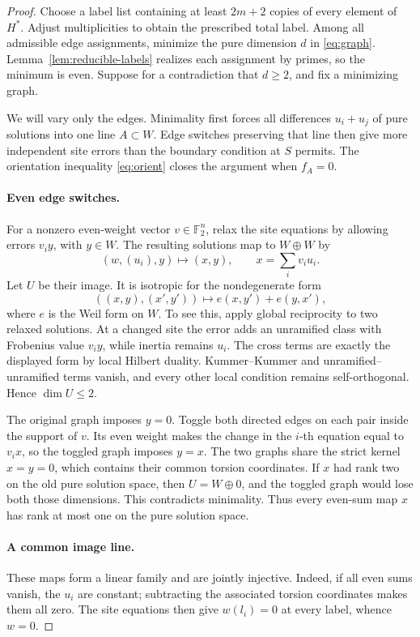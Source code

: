 \begin{proof}
Choose a label list containing at least \(2m+2\) copies of every element
of \(H^*\).  Adjust multiplicities to obtain the prescribed total label.
Among all admissible edge assignments, minimize the pure dimension
\(d\) in \eqref{eq:graph}.  Lemma~\ref{lem:reducible-labels} realizes each
assignment by primes, so the minimum is even.  Suppose for a contradiction
that \(d\ge2\), and fix a minimizing graph.

We will vary only the edges.  Minimality first forces all differences
\(u_i+u_j\) of pure solutions into one line \(A\subset W\).  Edge
switches preserving that line then give more independent site errors
than the boundary condition at \(S\) permits.  The orientation inequality
\eqref{eq:orient} closes the argument when \(f_A=0\).

\paragraph{Even edge switches.}
For a nonzero even-weight vector \(v\in\mathbb F_2^n\), relax the site
equations by allowing errors \(v_i y\), with \(y\in W\).  The resulting
solutions map to \(W\oplus W\) by
\[
 (w,(u_i),y)\longmapsto(x,y),\qquad x=\sum_i v_i u_i.
\]
Let \(U\) be their image.  It is isotropic for the nondegenerate form
\[
 ((x,y),(x',y'))\longmapsto e(x,y')+e(y,x'),
\]
where \(e\) is the Weil form on \(W\).  To see this, apply global
reciprocity to two relaxed solutions.  At a changed site the error adds
an unramified class with Frobenius value \(v_i y\), while inertia remains
\(u_i\).  The cross terms are exactly the displayed form by local
Hilbert duality.  Kummer--Kummer and unramified--unramified terms vanish,
and every other local condition remains self-orthogonal.  Hence
\(\dim U\le2\).

The original graph imposes \(y=0\).  Toggle both directed edges on each
pair inside the support of \(v\).  Its even weight makes the change in
the \(i\)-th equation equal to \(v_i x\), so the toggled graph imposes
\(y=x\).  The two graphs share the strict kernel \(x=y=0\), which
contains their common torsion coordinates.  If \(x\) had rank two on the
old pure solution space, then \(U=W\oplus0\), and the toggled graph would
lose both those dimensions.  This contradicts minimality.  Thus every
even-sum map \(x\) has rank at most one on the pure solution space.

\paragraph{A common image line.}
These maps form a linear family and are jointly injective.  Indeed, if
all even sums vanish, the \(u_i\) are constant; subtracting the associated
torsion coordinates makes them all zero.  The site equations then give
\(w(l_i)=0\) at every label, whence \(w=0\).


\end{proof}
